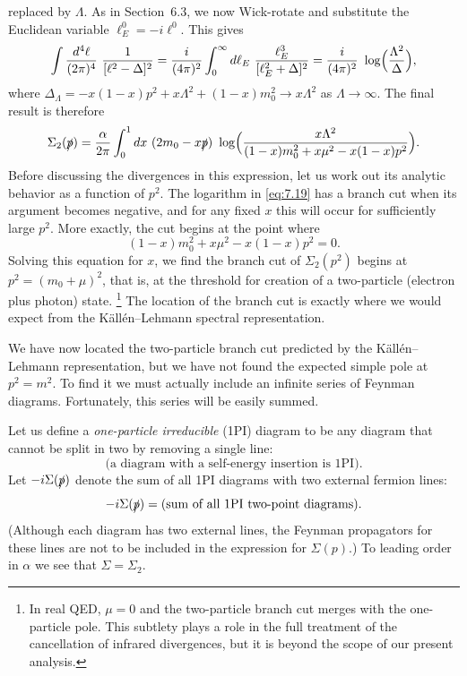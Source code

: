 replaced by $\Lambda$.  As in Section~6.3, we now Wick-rotate and substitute
the Euclidean variable $\ell_E^0 = -i\ell^0$.  This gives
\begin{equation}
  \int \frac{d^4\ell}{(2\pi)^4}\ \frac{1}{[\ell^2-\Delta]^2}
  = \frac{i}{(4\pi)^2}\int_0^{\infty} d\ell_E\
    \frac{\ell_E^3}{[\ell_E^2+\Delta]^2}
  = \frac{i}{(4\pi)^2}\ \log\Bigl( \frac{\Lambda^2}{\Delta} \Bigr),
  \label{eq:7.18}
\end{equation}
where $\Delta_\Lambda = -x(1-x)p^2 + x\Lambda^2 + (1-x)m_0^2 \to x\Lambda^2$
as $\Lambda\to\infty$.  The final result is therefore
\begin{equation}
  \Sigma_2(\slashed{p}) = \frac{\alpha}{2\pi}\int_0^1 dx\ (2m_0 - x\slashed{p})\
    \log\Bigl( \frac{x\Lambda^2}{(1-x)m_0^2 + x\mu^2 - x(1-x)p^2} \Bigr) .
  \label{eq:7.19}
\end{equation}
Before discussing the divergences in this expression, let us work out its
analytic behavior as a function of $p^2$.  The logarithm in \eqref{eq:7.19}
has a branch cut when its argument becomes negative, and for any fixed $x$
this will occur for sufficiently large $p^2$.  More exactly, the cut begins at
the point where
\begin{equation}
  (1-x)m_0^2 + x\mu^2 - x(1-x)p^2 = 0 .
\end{equation}
Solving this equation for $x$, we find the branch cut of $\Sigma_2(p^2)$
begins at $p^2 = (m_0+\mu)^2$, that is, at the threshold for creation of a
two-particle (electron plus photon) state.%
\footnote{In real QED, $\mu = 0$ and the two-particle branch cut merges with
the one-particle pole.  This subtlety plays a role in the full treatment of
the cancellation of infrared divergences, but it is beyond the scope of our
present analysis.}  The location of the branch cut is exactly where we would
expect from the K\"all\'en--Lehmann spectral representation.

We have now located the two-particle branch cut predicted by the
K\"all\'en--Lehmann representation, but we have not found the expected simple
pole at $p^2 = m^2$.  To find it we must actually include an infinite series
of Feynman diagrams.  Fortunately, this series will be easily summed.

Let us define a \emph{one-particle irreducible} (1PI) diagram to be any
diagram that cannot be split in two by removing a single line:
\begin{equation}
  \text{(a diagram with a self-energy insertion is 1PI)} .
\end{equation}
Let $-i\Sigma(\slashed{p})$ denote the sum of all 1PI diagrams with two
external fermion lines:
\begin{equation}
  -i\Sigma(\slashed{p}) = \text{(sum of all 1PI two-point diagrams)} .
  \label{eq:7.21}
\end{equation}
(Although each diagram has two external lines, the Feynman propagators for
these lines are not to be included in the expression for $\Sigma(p)$.)  To
leading order in $\alpha$ we see that $\Sigma = \Sigma_2$.

